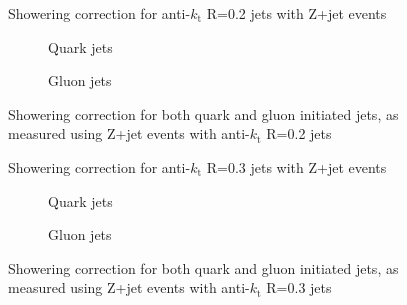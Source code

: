 \clearpage
\begin{figure}[!ht]
 \centering
 \caption[Showering correction for anti-$k_{\mathrm t}$ R=0.2 jets with Z+jet events]
 {\small Showering correction for anti-$k_{\mathrm t}$ R=0.2 jets with Z+jet events}
 \label{plot:ZJetShowering2App}
\end{figure}

\begin{figure}[!ht]
 \centering
 \begin{subfigure}{.5\textwidth}
  \centering
  \caption{Quark jets}
 \end{subfigure}%
 \begin{subfigure}{.5\textwidth}
  \centering
  \caption{Gluon jets}
 \end{subfigure}
 \caption[Quark/gluon jet showering correction, anti-$k_{\mathrm t}$ R=0.2, Z+jet]
 {\small Showering correction for both quark and gluon initiated jets, as measured using Z+jet events with anti-$k_{\mathrm t}$ R=0.2 jets}
 \label{plot:ZJetShoweringFlav2App}
\end{figure}

\clearpage
\begin{figure}[!ht]
 \centering
 \caption[Showering correction for anti-$k_{\mathrm t}$ R=0.3 jets with Z+jet events]
 {\small Showering correction for anti-$k_{\mathrm t}$ R=0.3 jets with Z+jet events}
 \label{plot:ZJetShowering3App}
\end{figure}

\begin{figure}[!ht]
 \centering
 \begin{subfigure}{.5\textwidth}
  \centering
  \caption{Quark jets}
 \end{subfigure}%
 \begin{subfigure}{.5\textwidth}
  \centering
  \caption{Gluon jets}
 \end{subfigure}
 \caption[Quark/gluon jet showering correction, anti-$k_{\mathrm t}$ R=0.3, Z+jet]
 {\small Showering correction for both quark and gluon initiated jets, as measured using Z+jet events with anti-$k_{\mathrm t}$ R=0.3 jets}
 \label{plot:ZJetShoweringFlav3App}
\end{figure}

